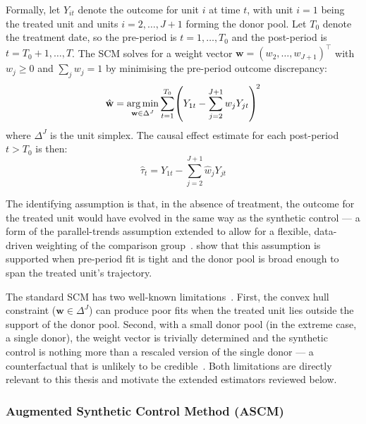 Formally, let $Y_{it}$ denote the outcome for unit $i$ at time $t$,
with unit $i = 1$ being the treated unit and units
$i = 2, \ldots, J+1$ forming the donor pool.
Let $T_0$ denote the treatment date, so the pre-period is
$t = 1, \ldots, T_0$ and the post-period is
$t = T_0+1, \ldots, T$.
The SCM solves for a weight vector
$\mathbf{w} = (w_2, \ldots, w_{J+1})^\top$ with $w_j \geq 0$ and
$\sum_j w_j = 1$ by minimising the pre-period outcome discrepancy:
\begin{equation}
  \hat{\mathbf{w}} = \operatorname*{arg\,min}_{\mathbf{w} \in \Delta^J}
  \sum_{t=1}^{T_0} \!\left(Y_{1t} - \sum_{j=2}^{J+1} w_j Y_{jt}\right)^{\!2}
  \label{eq:scm}
\end{equation}
where $\Delta^J$ is the unit simplex.
The causal effect estimate for each post-period $t > T_0$ is then:
\begin{equation}
  \hat{\tau}_t = Y_{1t} - \sum_{j=2}^{J+1} \hat{w}_j Y_{jt}
  \label{eq:gap}
\end{equation}

The identifying assumption is that, in the absence of treatment, the
outcome for the treated unit would have evolved in the same way as
the synthetic control --- a form of the parallel-trends assumption
extended to allow for a flexible, data-driven weighting of the
comparison group~\parencite{abadie2010}.
\textcite{abadie2010} show that this assumption is supported when
pre-period fit is tight and the donor pool is broad enough to span
the treated unit's trajectory.

The standard SCM has two well-known limitations~\parencite{benmichael2021}.
First, the convex hull constraint ($\mathbf{w} \in \Delta^J$) can
produce poor fits when the treated unit lies outside the support of
the donor pool.
Second, with a small donor pool (in the extreme case, a single donor),
the weight vector is trivially determined and the synthetic control
is nothing more than a rescaled version of the single donor ---
a counterfactual that is unlikely to be credible~\parencite{abadie2003}.
Both limitations are directly relevant to this thesis and motivate the
extended estimators reviewed below.

\subsubsection{Augmented Synthetic Control Method (ASCM)}
\label{sec:ascm}

